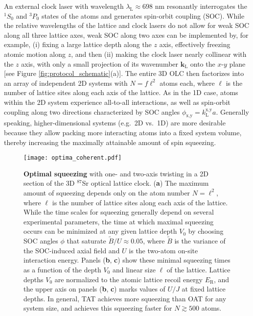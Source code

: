 \documentclass[aps,prx,superscriptaddress,notitlepage,twocolumn,longbibliography]{revtex4-1}
\renewcommand{\t}{\text} %
\renewcommand{\v}{\bm} %
\newcommand{\x}{\text{x}}
\newcommand{\y}{\text{y}}
\begin{document}
An external clock laser with wavelength $\lambda_{\t{L}}\approx698$ nm resonantly interrogates the $^1S_0$ and $^3P_0$ states of the atoms and generates spin-orbit coupling (SOC)\cite{wall2016synthetic}.
While the relative wavelengths of the lattice and clock lasers do not allow for weak SOC along all three lattice axes, weak SOC along two axes can be implemented by, for example, (i) fixing a large lattice depth along the $z$ axis, effectively freezing atomic motion along  $z$, and then (ii) making the clock laser nearly collinear with the $z$ axis, with only a small projection of its wavenumber $\v k_{\t{L}}$ onto the $x$-$y$ plane [see Figure \ref{fig:protocol_schematic}(a)].
The entire 3D OLC then factorizes into an array of independent 2D systems with $N=f\ell^2$ atoms each, where $\ell$ is the number of lattice sites along each axis of the lattice.
As in the 1D case, atoms within the 2D system experience all-to-all interactions, as well as spin-orbit coupling along two directions characterized by SOC angles $\phi_{\x,\y}=k_{\t{L}}^{\x,\y}a$.
Generally speaking, higher-dimensional systems (e.g.~2D vs.~1D) are more desirable because they allow packing more interacting atoms into a fixed system volume, thereby increasing the maximally attainable amount of spin squeezing.

\begin{figure*}
\centering
\texttt{[image: optima\_coherent.pdf]}
\caption{{\bf Optimal squeezing} with one- and two-axis twisting in a 2D section of the 3D $^{87}$Sr optical lattice clock.
({\bf a}) The maximum amount of squeezing depends only on the atom number $N=\ell^2$, where $\ell$ is the number of lattice sites along each axis of the lattice.
While the time scales for squeezing generally depend on several experimental parameters, the time at which maximal squeezing occurs can be minimized at any given lattice depth $V_0$ by choosing SOC angles $\phi$ that saturate $\widetilde{B}/U\approx0.05$, where $\widetilde{B}$ is the variance of the SOC-induced axial field and $U$ is the two-atom on-site interaction energy.
Panels ({\bf b}, {\bf c}) show these minimal squeezing times as a function of the depth $V_0$ and linear size $\ell$ of the lattice.
Lattice depths $V_0$ are normalized to the atomic lattice recoil energy $E_{\t{R}}$, and the upper axis on panels ({\bf b}, {\bf c}) marks values of  $U/J$ at fixed lattice depths.
In general, TAT achieves more squeezing than OAT for any system size, and achieves this squeezing faster for $N\gtrsim500$ atoms.
}
\label{fig:optima_coherent}
\end{figure*}
\end{document}
